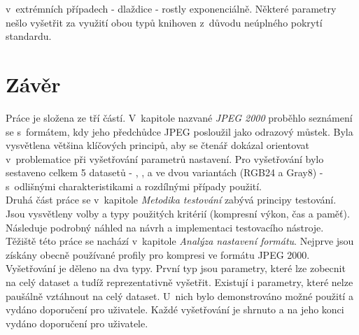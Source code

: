 v~extrémních případech - dlaždice - rostly exponenciálně. Některé parametry nešlo vyšetřit za využití obou typů knihoven z~důvodu neúplného pokrytí standardu. 

\chapter{Závěr}
\label{zaver}
Práce je složena ze tří částí. V~kapitole nazvané \textit{JPEG 2000} proběhlo seznámení se s~formátem, kdy jeho předchůdce JPEG posloužil jako odrazový můstek. Byla vysvětlena většina klíčových principů, aby se čtenář dokázal orientovat v~problematice při vyšetřování parametrů nastavení. Pro vyšetřování bylo sestaveno celkem 5 datasetů - , ,  a  ve dvou variantách (RGB24 a Gray8) - s~odlišnými charakteristikami a rozdílnými případy použití.\\
Druhá část práce se v~kapitole \textit{Metodika testování} zabývá principy testování. Jsou vysvětleny volby a typy použitých kritérií (kompresní výkon, čas a paměť). Následuje podrobný náhled na návrh a implementaci testovacího nástroje.\\ 
Těžiště této práce se nachází v~kapitole \textit{Analýza nastavení formátu}. Nejprve jsou získány obecně používané profily pro kompresi ve formátu JPEG 2000. Vyšetřování je děleno na dva typy. První typ jsou parametry, které lze zobecnit na celý dataset a tudíž reprezentativně vyšetřit. Existují i parametry, které nelze paušálně vztáhnout na celý dataset. U~nich bylo demonstrováno možné použití a vydáno doporučení pro uživatele. Každé vyšetřování je shrnuto a na jeho konci vydáno doporučení pro uživatele.




